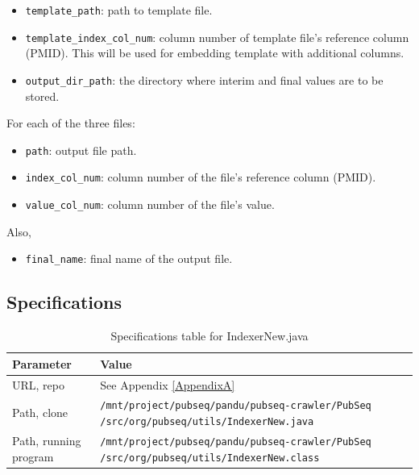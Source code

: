 \begin{itemize}
\item \texttt{template\_path}: path to template file.
\item \texttt{template\_index\_col\_num}: column number of template file's reference column (PMID). This will be used for embedding template with additional columns.
\item \texttt{output\_dir\_path}: the directory where interim and final values are to be stored.
\end{itemize}

For each of the three files:

\begin{itemize}
\item \texttt{path}: output file path.
\item \texttt{index\_col\_num}: column number of the file's reference column (PMID).
\item \texttt{value\_col\_num}: column number of the file's value.
\end{itemize}

Also,

\begin{itemize}
\item \texttt{final\_name}: final name of the output file.
\end{itemize}

\subsection{Specifications}

\begin{table}[htbp]
\caption{Specifications table for IndexerNew.java}
\centering
\begin{tabularx}{\textwidth}{ | l | X | }
  \hline
  Parameter & Value \\
  \hline
  URL, repo & See Appendix \ref{AppendixA} \\
  Path, clone & \texttt{/mnt/project/pubseq/pandu/pubseq-crawler/PubSeq /src/org/pubseq/utils/IndexerNew.java} \\
  Path, running program & \texttt{/mnt/project/pubseq/pandu/pubseq-crawler/PubSeq /src/org/pubseq/utils/IndexerNew.class}\\
  \hline
\end{tabularx}
\end{table}


